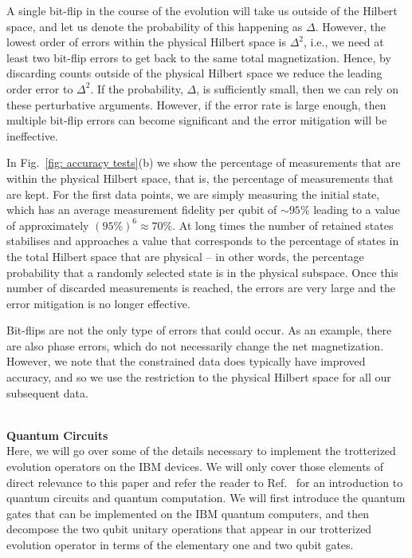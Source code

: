 \documentclass[twocolumn,showpacs,preprintnumbers,nofootinbib,amsmath,aps,pra,longbibliography,amssymb,superscriptaddress]{revtex4-1}
\begin{document}
A single bit-flip in the course of the evolution will take us outside of the Hilbert space, and let us denote the probability of this happening as $\Delta$. However, the lowest order of errors within the physical Hilbert space is $\Delta^2$, i.e., we need at least two bit-flip errors to get back to the same total magnetization. Hence, by discarding counts outside of the physical Hilbert space we reduce the leading order error to $\Delta^2$. If the probability, $\Delta$, is sufficiently small, then we can rely on these perturbative arguments. However, if the error rate is large enough, then multiple bit-flip errors can become significant and the error mitigation will be ineffective. 


In Fig.~\ref{fig: accuracy tests}(b) we show the percentage of measurements that are within the physical Hilbert space, that is, the percentage of measurements that are kept. For the first data points, we are simply measuring the initial state, which has an average measurement fidelity per qubit of $\sim 95 \%$ leading to a value of approximately $(95\%)^6 \approx 70\%$. At long times the number of retained states stabilises and approaches a value that corresponds to the percentage of states in the total Hilbert space that are physical -- in other words, the percentage probability that a randomly selected state is in the physical subspace. Once this number of discarded measurements is reached, the errors are very large and the error mitigation is no longer effective.

Bit-flips are not the only type of errors that could occur.
As an example, there are also phase errors, which do not necessarily change the net magnetization. However, we note that the constrained data does typically have improved accuracy, and so we use the restriction to the physical Hilbert space for all our subsequent data.




\hfill\\\textbf{Quantum Circuits}\\
Here, we will go over some of the details necessary to implement the trotterized evolution operators on the IBM devices. We will only cover those elements of direct relevance to this paper and refer the reader to Ref.~\cite{Nielsen2010} for an introduction to quantum circuits and quantum computation. We will first introduce the quantum gates that can be implemented on the IBM quantum computers, and then decompose the two qubit unitary operations that appear in our trotterized evolution operator in terms of the elementary one and two qubit gates.
\end{document}
